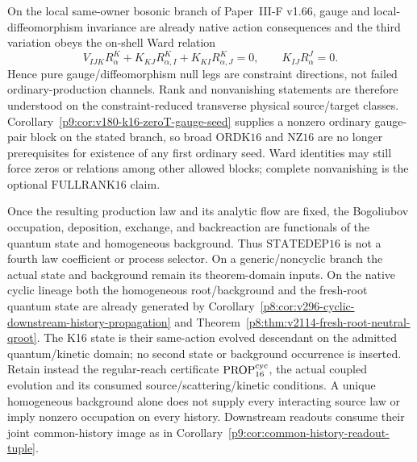 \documentclass[12pt,a4paper]{article}
\begin{document}
\begin{theorem}
\label{p9:thm:v148-k16-ward-retained-history-frontier}
On the local same-owner bosonic branch of Paper~III-F v1.66, gauge and
local-diffeomorphism invariance are already native action consequences and the
third variation obeys the on-shell Ward relation
\[
 V_{IJK}R_\alpha^K
 +K_{KJ}R_{\alpha,I}^K
 +K_{KI}R_{\alpha,J}^K=0,
 \qquad
 K_{IJ}R_\alpha^J=0.
\]
Hence pure gauge/diffeomorphism null legs are constraint directions, not failed
ordinary-production channels.  Rank and nonvanishing statements are therefore
understood on the constraint-reduced transverse physical source/target
classes.  Corollary~\ref{p9:cor:v180-k16-zeroT-gauge-seed} supplies a nonzero
ordinary gauge-pair block on the stated branch, so broad \(\mathrm{ORDK16}\)
and \(\mathrm{NZ16}\) are no longer prerequisites for existence of any first
ordinary seed.  Ward identities may still force zeros or relations among other
allowed blocks; complete nonvanishing is the optional \(\mathrm{FULLRANK16}\)
claim.

Once the resulting production law and its analytic flow are fixed, the
Bogoliubov occupation, deposition, exchange, and backreaction are functionals
of the quantum state and homogeneous background.  Thus \(\mathrm{STATEDEP16}\)
is not a fourth law coefficient or process selector.  On a generic/noncyclic
branch the actual state and background remain its theorem-domain inputs.
On the native cyclic lineage both the homogeneous root/background and the
fresh-root quantum state are already generated by
Corollary~\ref{p8:cor:v296-cyclic-downstream-history-propagation} and
Theorem~\ref{p8:thm:v2114-fresh-root-neutral-qroot}.  The K16 state is their
same-action evolved descendant on the admitted quantum/kinetic domain; no
second state or background occurrence is inserted.  Retain instead the
regular-reach certificate \(\mathrm{PROP}^{\rm cyc}_{16}\), the actual
coupled evolution and its consumed source/scattering/kinetic conditions.
A unique homogeneous background alone does not supply every interacting
source law or imply nonzero occupation on every history.  Downstream
readouts consume their joint common-history image as in
Corollary~\ref{p9:cor:common-history-readout-tuple}.
\end{theorem}
\end{document}
